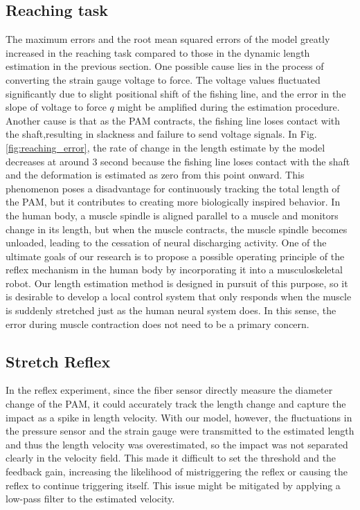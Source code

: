 \subsection{Reaching task}
The maximum errors and the root mean squared errors of the model greatly increased in the reaching task compared to those in the dynamic length estimation in the previous section. One possible cause lies in the process of converting the strain gauge voltage to force. The voltage values fluctuated significantly due to slight positional shift of the fishing line, and the error in the slope of voltage to force $q$ might be amplified during the estimation procedure. Another cause is that as the PAM contracts, the fishing line loses contact with the shaft,resulting in slackness and failure to send voltage signals. In Fig.\ref{fig:reaching_error}, the rate of change in the length estimate by the model decreases at around 3 second because the fishing line loses contact with the shaft and the deformation is estimated as zero from this point onward. This phenomenon poses a disadvantage for continuously tracking the total length of the PAM, but it contributes to creating more biologically inspired behavior. In the human body, a muscle spindle is aligned parallel to a muscle and monitors change in its length, but when the muscle contracts, the muscle spindle becomes unloaded, leading to the cessation of neural discharging activity\cite{spindle}. One of the ultimate goals of our research is to propose a possible operating principle of the reflex mechanism in the human body by incorporating it into a musculoskeletal robot. Our length estimation method is designed in pursuit of this purpose, so it is desirable to develop a local control system that only responds when the muscle is suddenly stretched just as the human neural system does. In this sense, the error during muscle contraction does not need to be a primary concern.

\subsection{Stretch Reflex}
In the reflex experiment, since the fiber sensor directly measure the diameter change of the PAM, it could accurately track the length change and capture the impact as a spike in length velocity. With our model, however, the fluctuations in the pressure sensor and the strain gauge were transmitted to the estimated length and thus the length velocity was overestimated, so the impact was not separated clearly in the velocity field. This made it difficult to set the threshold and the feedback gain, increasing the likelihood of mistriggering the reflex or causing the reflex to continue triggering itself. This issue might be mitigated by applying a low-pass filter to the estimated velocity.

